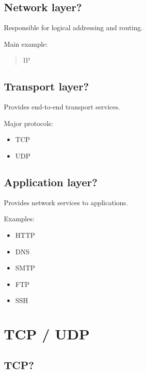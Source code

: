 \medskip

\subsection{Network layer?}

Responsible for logical addressing and routing.

Main example:

\begin{quote}
IP\\
\end{quote}

\medskip

\subsection{Transport layer?}

Provides end-to-end transport services.

Major protocols:

\begin{itemize}
  \item TCP
  \item UDP
\end{itemize}

\medskip

\subsection{Application layer?}

Provides network services to applications.

Examples:

\begin{itemize}
  \item HTTP
  \item DNS
  \item SMTP
  \item FTP
  \item SSH
\end{itemize}

\medskip

\section{TCP / UDP}

\subsection{TCP?}

